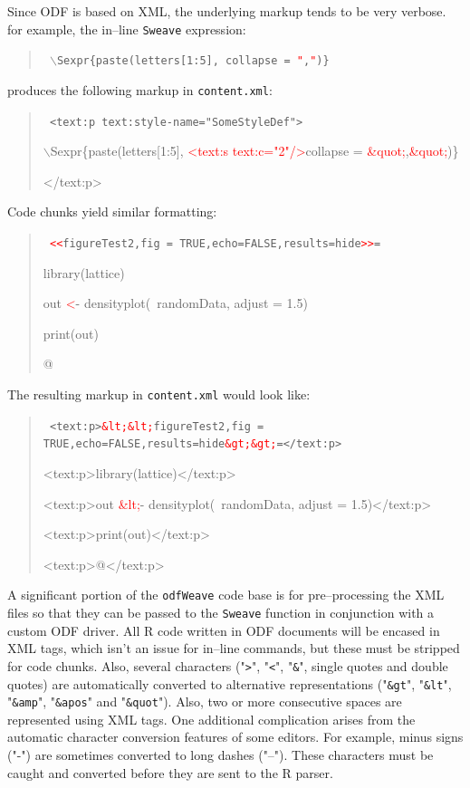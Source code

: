 \documentclass[12pt]{article}
\begin{document}
Since ODF is based on XML, the underlying markup tends to be very verbose. for example, the in--line \texttt{Sweave} expression:
\begin{quote}
{\tt \footnotesize
$\backslash$Sexpr\{paste(letters[1:5],   collapse = \textcolor{red}{"},\textcolor{red}{"})\}
}
\end{quote}
produces the following markup in \texttt{content.xml}:
\begin{quote}
{\tt \footnotesize
<text:p text:style-name="SomeStyleDef">

  $\backslash$Sexpr\{paste(letters[1:5], \textcolor{red}{<text:s text:c="2"/>}collapse = \textcolor{red}{\&quot;},\textcolor{red}{\&quot;})\} 
  
</text:p>
}
\end{quote}
Code chunks yield similar formatting:
\begin{quote}
{\tt \footnotesize
\textcolor{red}{<<}figureTest2,fig = TRUE,echo=FALSE,results=hide\textcolor{red}{>>}=

library(lattice)

out \textcolor{red}{<}- densityplot(~randomData, adjust = 1.5)

print(out)

@
}
\end{quote}
The resulting markup in \texttt{content.xml} would look like:
\begin{quote}
{\tt \footnotesize
<text:p>\textcolor{red}{\&lt;\&lt;}figureTest2,fig = TRUE,echo=FALSE,results=hide\textcolor{red}{\&gt;\&gt;}=</text:p>

<text:p>library(lattice)</text:p>

<text:p>out \textcolor{red}{\&lt;}- densityplot(~randomData, adjust = 1.5)</text:p>

<text:p>print(out)</text:p>

<text:p>@</text:p>}
\end{quote}

A significant portion of the \texttt{odfWeave} code base is for pre--processing the XML files so that they can be passed to the \texttt{Sweave} function in conjunction with a custom ODF driver. All R code written in ODF documents will be encased in XML tags, which isn't an issue for in--line commands, but these must be stripped for code chunks. Also, several characters ("\texttt{>}", "\texttt{<}", "\texttt{\&}", single quotes and double quotes) are automatically converted to alternative representations ("\texttt{\&gt}", "\texttt{\&lt}", "\texttt{\&amp}", "\texttt{\&apos}" and "\texttt{\&quot}"). Also, two or more consecutive spaces are represented using XML tags. One additional complication arises from the automatic character conversion features of some editors. For example, minus signs ("-") are sometimes converted to long dashes ("--"). These characters must be caught and converted before they are sent to the R parser. 
\end{document}
